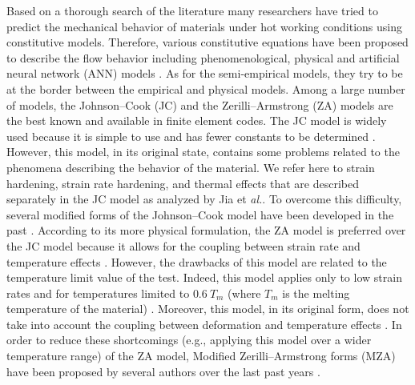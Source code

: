 \documentclass[twoside,english,1p,final,sort&compress]{elsarticle}
\makeatletter
\theoremstyle{plain}
\newcommand*{\eal}{et \emph{al.}\@\xspace}
\newcommand*{\eg}{e.g.,\@\xspace}
\makeatother
\begin{document}
Based on a thorough search of the literature many researchers have tried to predict the mechanical behavior of materials under hot working conditions using constitutive models. Therefore, various constitutive equations have been proposed to describe the flow behavior including phenomenological, physical and artiﬁcial neural network (ANN) models \cite{lin2011critical,shin2010phenomenological,rusinek2010thermo}. As for the semi-empirical models, they try to be at the border between the empirical and physical models. Among a large number of models, the Johnson--Cook (JC) \cite{Johnson-1983-Constitutive, Johnson-1985-Fracture} and the Zerilli--Armstrong (ZA) \cite{Zerilli-1987-Dislocation} models are the best known and available in finite element codes. The JC model is widely used because it is simple to use and has fewer constants to be determined \cite{Khan-2004-Quasi-static, NematNasser-2003-Thermomechanical}. However, this model, in its original state, contains some problems related to the phenomena describing the behavior of the material. We refer here to strain hardening, strain rate hardening, and thermal effects that are described separately in the JC model as analyzed by Jia \eal \cite{Jia-2021-Modified-JC}. To overcome this difficulty, several modified forms of the Johnson--Cook model have been developed in the past \cite{Rule-1998-Revised-JC, Vural-2003-Large, Lin-2010-Modified-JC, Lin-2012-Phenomenological, Li-2013-Modified-JC, Zhou-2019-Research, Zhang-2015-Modified-JC}. According to its more physical formulation, the ZA model is preferred over the JC model because it allows for the coupling between strain rate and temperature effects \cite{Johnson-1988-Evaluation, Voyiadjis-2005-Microstructural, Dey-2007-Influence}. However, the drawbacks of this model are related to the temperature limit value of the test. Indeed, this model applies only to low strain rates and for temperatures limited to $0.6~T_m$ (where $T_m$ is the melting temperature of the material) \cite{Chiou-2005-Strain, Lee-2005-Strain, Chen-2007-Comparative, Lee-2006-Effects}. Moreover, this model, in its original form, does not take into account the coupling between deformation and temperature effects \cite{Samantaray-2009-Thermo-viscoplastic}. In order to reduce these shortcomings (\eg applying this model over a wider temperature range) of the ZA model, Modified Zerilli--Armstrong forms (MZA) have been proposed by several authors over the last past years \cite{Nemat-2004-Plasticity, Lennon-2004-Influence, Muralli-2017-Performance, Cheng-2021-Modified-ZA, Muralli-2021-Finite}.
\end{document}
